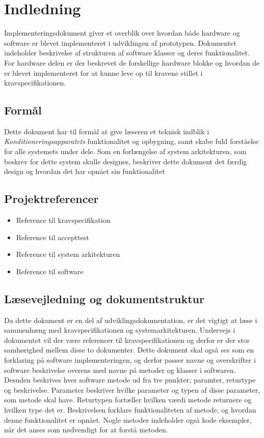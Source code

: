 	\chapter{Indledning}
	Implementeringsdokument giver et overblik over hvordan både hardware og software er blevet implementeret i udviklingen af prototypen. Dokumentet indeholder beskrivelse af strukturen af software klasser og deres funktionalitet. For hardware delen er der beskrevet de forskellige hardware blokke og hvordan de er blevet implementeret for at kunne leve op til kravene stillet i kravspecifikationen. 
	
	\section{Formål}
	Dette dokument har til formål at give læseren et teknisk indblik i \textit{Konditioneringsapparatets} funktionalitet og opbygning, samt skabe fuld forståelse for alle systemets under dele. Som en forlængelse af system arkitekturen, som beskrev for dette system skulle designes, beskriver dette dokument det færdig design og hvordan det har opnået sin funktionalitet
	
	\section{Projektreferencer}
	\begin{itemize}
		\item Reference til kravspecifikation
		\item Reference til accepttest
		\item Reference til system arkitekturen
		\item Reference til software
	\end{itemize}
	
	\section{Læsevejledning og dokumentstruktur}
	Da dette dokument er en del af udviklingsdokumentation, er det vigtigt at læse i sammenhæng med kravspecifikationen og systemarkitekturen. Undervejs i dokumentet vil der være referencer til kravspecifikationen og derfor er der stor samhørighed mellem disse to dokumenter. Dette dokument skal også ses som en forklaring på software implementeringen, og derfor passer navne og overskrifter i software beskrivelse overens med navne på metoder og klasser i softwaren. Desuden beskrives hver software metode ud fra tre punkter; paramter, returtype og beskrivelse. Parameter beskriver hvilke parameter og typen af disse parameter, som metode skal have. Returtypen fortæller hvilken værdi metode returnere og hvilken type det er. Beskrivelsen forklare funktionaliteten af metode, og hvordan denne funktionalitet er opnået. Nogle metoder indeholder også kode eksempler, når det anses som nødvendigt for at forstå metoden. 

